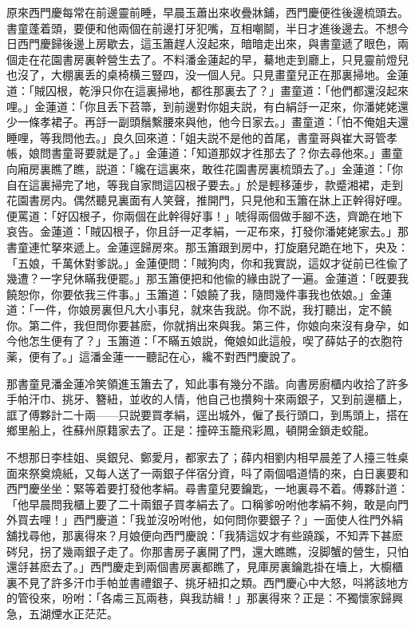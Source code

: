 原來西門慶每常在前邊靈前睡，早晨玉蕭出來收疊牀鋪，西門慶便徃後邊梳頭去。書童蓬着頭，要便和他兩個在前邊打牙犯嘴，互相嘲鬬，半日才進後邊去。不想今日西門慶歸後邊上房歇去，這玉簫趕人沒起來，暗暗走出來，與書童遞了眼色，兩個走在花園書房裏幹營生去了。不料潘金蓮起的早，驀地走到廳上，只見靈前燈兒也沒了，大棚裏丢的桌椅横三豎四，没一個人兒。只見畫童兒正在那裏掃地。金蓮道：「賊囚根，乾淨只你在這裏掃地，都徃那裏去了？」畫童道：「他們都還沒起來哩。」金蓮道：「你且丢下苕箒，到前邊對你姐夫説，有白絹㧱一疋來，你潘姥姥還少一條孝裙子。再㧱一副頭鬚繫腰來與他，他今日家去。」畫童道：「怕不俺姐夫還睡哩，等我問他去。」良久回來道：「姐夫説不是他的首尾，書童哥與崔大哥管孝帳，娘問書童哥要就是了。」金蓮道：「知道那奴才徃那去了？你去尋他來。」畫童向廂房裏瞧了瞧，説道：「纔在這裏來，敢徃花園書房裏梳頭去了。」金蓮道：「你自在這裏掃完了地，等我自家問這囚根子要去。」於是輕移蓮步，款蹙湘裙，走到花園書房内。偶然聽見裏面有人笑聲，推開門，只見他和玉簫在牀上正幹得好哩。便罵道：「好囚根子，你兩個在此幹得好事！」唬得兩個做手腳不迭，齊跪在地下哀告。金蓮道：「賊囚根子，你且㧱一疋孝絹，一疋布來，打發你潘姥姥家去。」那書童連忙拏來遞上。金蓮逕歸房來。那玉簫跟到房中，打旋磨兒跪在地下，央及：「五娘，千萬休對爹説。」金蓮便問：「賊狗肉，你和我實説，這奴才従前已徃偸了幾遭？一字兒休瞞我便罷。」那玉簫便把和他偸的緣由説了一遍。金蓮道：「旣要我饒恕你，你要依我三件事。」玉簫道：「娘饒了我，隨問幾件事我也依娘。」金蓮道：「一件，你娘房裏但凡大小事兒，就來告我説。你不説，我打聽出，定不饒你。第二件，我但問你要甚麽，你就捎出來與我。第三件，你娘向來沒有身孕，如今他怎生便有了？」玉簫道：「不瞞五娘説，俺娘如此這般，喫了薛姑子的衣胞符薬，便有了。」這潘金蓮一一聽記在心，纔不對西門慶說了。

那書童見潘金蓮冷笑領進玉簫去了，知此事有幾分不諧。向書房廚櫃内收拾了許多手帕汗巾、挑牙、簪紐，並收的人情，他自己也攢夠十來兩銀子，又到前邊櫃上，誆了傅夥計二十兩——只説要買孝絹，逕出城外，僱了長行頭口，到馬頭上，搭在鄉里船上，徃蘇州原籍家去了。正是：撞碎玉籠飛彩鳳，頓開金鎖走蛟龍。

不想那日李桂姐、吳銀兒、鄭愛月，都家去了；薛内相劉内相早晨差了人擡三牲桌面來祭奠燒紙，又每人送了一兩銀子伴宿分資，呌了兩個唱道情的來，白日裏要和西門慶坐坐：緊等着要打發他孝絹。尋書童兒要鑰匙，一地裏尋不着。傅夥計道：「他早晨問我櫃上要了二十兩銀子買孝絹去了。口稱爹吩咐他孝絹不夠，敢是向門外買去哩！」西門慶道：「我並沒吩咐他，如何問你要銀子？」一面使人徃門外絹舖找尋他，那裏得來？月娘便向西門慶說：「我猜這奴才有些蹺蹊，不知弄下甚麽硶兒，拐了幾兩銀子走了。你那書房子裏開了門，還大瞧瞧，沒脚蟹的營生，只怕還㧱甚麽去了。」西門慶走到兩個書房裏都瞧了，見庫房裏鑰匙掛在墻上，大櫥櫃裏不見了許多汗巾手帕並書禮銀子、挑牙紐扣之類。西門慶心中大怒，呌將該地方的管役來，吩咐：「各䖏三瓦兩巷，與我訪緝！」那裏得來？正是：不獨懷家歸興急，五湖煙水正茫茫。

